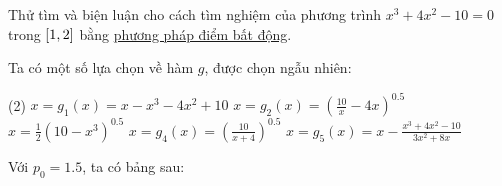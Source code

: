 \documentclass[../../Lectures]{subfiles}
\begin{document}
\begin{exmp}
    Thử tìm và biện luận cho cách tìm nghiệm của phương trình \(x^3 + 4x^2 - 10
    = 0\) trong \(\interval{1}{2}\) bằng \hyperref[method:fixed_point]{phương
    pháp điểm bất động}.

    Ta có một số lựa chọn về hàm \(g\), được chọn ngẫu nhiên:

    \begin{tasks}(2)
        \task \(x = g_1(x) = x - x^3 -4x^2 + 10\)
        \task \(x = g_2(x) = \left(\frac{10}{x} - 4x \right)^{0.5}\)
        \task \(x = \frac{1}{2} (10 - x^3)^{0.5}\)
        \task \(x = g_4(x) = \left(\frac{10}{x + 4} \right)^{0.5}\)
        \task \(x = g_5(x) = x - \frac{x^3 + 4x^2 - 10}{3x^2 + 8x}\)
    \end{tasks}

    Với \(p_0 = \num{1.5}\), ta có bảng sau:


\end{exmp}
\end{document}
